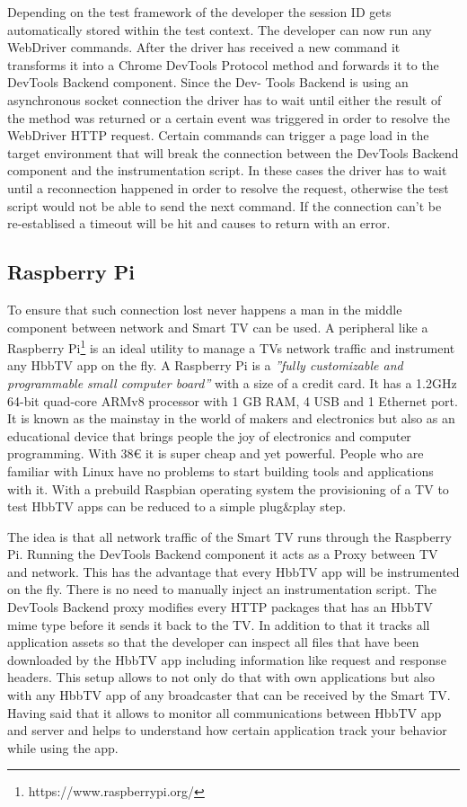 Depending on the test framework of the developer the session ID gets automatically stored within the
test context. The developer can now run any WebDriver commands. After the driver has received a new
command it transforms it into a Chrome DevTools Protocol method and forwards it to the DevTools
Backend component. Since the Dev- Tools Backend is using an asynchronous socket connection the driver
has to wait until either the result of the method was returned or a certain event was triggered in
order to resolve the WebDriver HTTP request. Certain commands can trigger a page load in the target
environment that will break the connection between the DevTools Backend component and the instrumentation
script. In these cases the driver has to wait until a reconnection happened in order to resolve the
request, otherwise the test script would not be able to send the next command. If the connection can't
be re-establised a timeout will be hit and causes to return with an error.

\subsection{Raspberry Pi\label{sec:pi}}

To ensure that such connection lost never happens a man in the middle component between network and
Smart TV can be used. A peripheral like a Raspberry Pi\footnote{https://www.raspberrypi.org/} is
an ideal utility to manage a TVs network traffic and instrument any HbbTV app on the fly. A
Raspberry Pi is a \textit{''fully customizable and programmable small computer board''}\cite{raspberrypi}
with a size of a credit card. It has a 1.2GHz 64-bit quad-core ARMv8 processor with 1 GB RAM,
4 USB and 1 Ethernet port. It is known as the mainstay in the world of makers and electronics but
also as an educational device that brings people the joy of electronics and computer programming.
With 38\euro{} it is super cheap and yet powerful. People who are familiar with Linux have no problems
to start building tools and applications with it. With a prebuild Raspbian operating system the
provisioning of a TV to test HbbTV apps can be reduced to a simple plug\&play step.

The idea is that all network traffic of the Smart TV runs through the Raspberry Pi. Running
the DevTools Backend component it acts as a Proxy between TV and network. This has the advantage
that every HbbTV app will be instrumented on the fly. There is no need to manually inject an
instrumentation script. The DevTools Backend proxy modifies every HTTP packages that has an HbbTV
mime type before it sends it back to the TV. In addition to that it tracks all application assets
so that the developer can inspect all files that have been downloaded by the HbbTV app including
information like request and response headers. This setup allows to not only do that with own
applications but also with any HbbTV app of any broadcaster that can be received by the Smart TV.
Having said that it allows to monitor all communications between HbbTV app and server and helps
to understand how certain application track your behavior while using the app.

